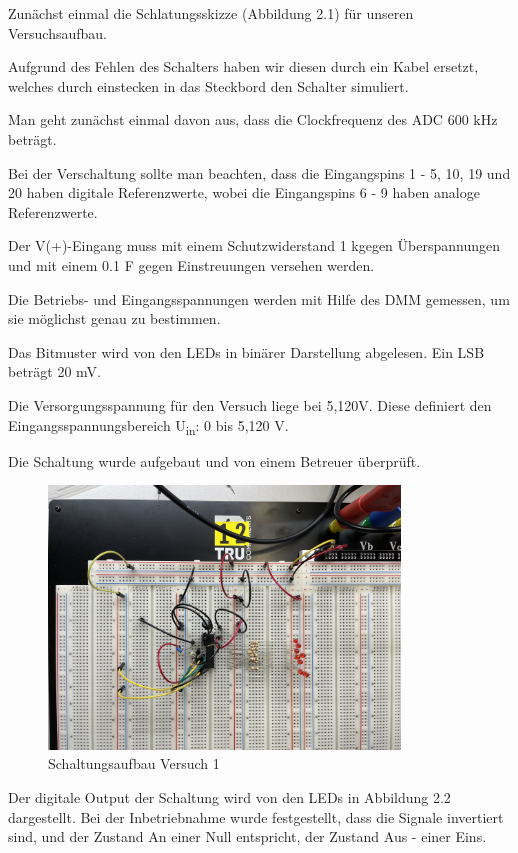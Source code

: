 Zunächst einmal die Schlatungsskizze (Abbildung 2.1) für unseren Versuchsaufbau.

Aufgrund des Fehlen des Schalters haben wir diesen durch ein Kabel ersetzt, welches 
durch einstecken in das Steckbord den Schalter simuliert. \par

Man geht zunächst einmal davon aus, dass die Clockfrequenz des ADC 600 kHz beträgt.\par
Bei der Verschaltung sollte man beachten, dass die Eingangspins 1 - 5, 10, 19 und 20 
haben digitale Referenzwerte, wobei die Eingangspins 6 - 9 haben analoge Referenzwerte.\par
Der V(+)-Eingang muss mit einem Schutzwiderstand 1 k\textOmega  gegen Überspannungen 
und mit einem 0.1 \textmu F gegen Einstreuungen versehen werden. \par

Die Betriebs- und Eingangsspannungen werden mit Hilfe des \acs{DMM} gemessen, um sie möglichst 
genau zu bestimmen.\par
Das Bitmuster wird von den \acs{LED}s in binärer Darstellung abgelesen. Ein \acs{LSB} beträgt 20 mV.\par
Die Versorgungsspannung für den Versuch liege bei 5,120V. Diese definiert den 
Eingangsspannungsbereich U\textsubscript{in}: 0 bis 5,120 V. \newline


Die Schaltung wurde aufgebaut und von einem Betreuer überprüft.
\begin{figure}[H]
	\centering
	\includegraphics[height=7cm]{images/Schaltungsaufbau-versuch-eins.jpeg} 
	\caption[]{Schaltungsaufbau Versuch 1}
\end{figure}

Der digitale Output der Schaltung wird von den \acs{LED}s in Abbildung 2.2 dargestellt.
Bei der Inbetriebnahme wurde festgestellt, dass die Signale invertiert sind, 
und der Zustand An einer Null entspricht, der Zustand Aus - einer Eins.

